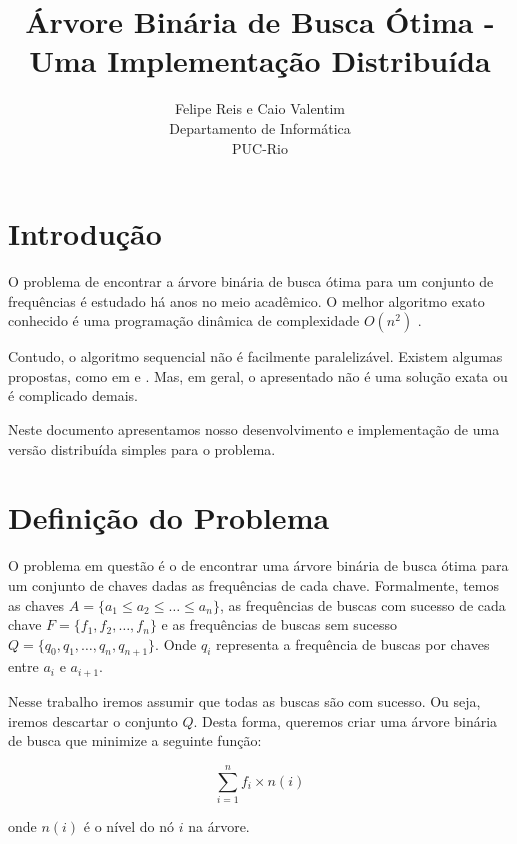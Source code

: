 \documentclass[12pt]{article}
\begin{document}
\nocite{*}

\title{Árvore Binária de Busca Ótima - Uma Implementação Distribuída}

\author{Felipe Reis e Caio Valentim\\ 
Departamento de Informática \\
PUC-Rio \\ 
}

\maketitle


\section{Introdução}
O problema de encontrar a árvore binária de busca ótima para um conjunto
de frequências é estudado há anos no meio acadêmico. O melhor algoritmo
exato conhecido é uma programação dinâmica de complexidade $O(n^2)$ \cite{knuth71}. 

Contudo, o algoritmo sequencial não é facilmente paralelizável. Existem
algumas propostas, como em \cite{karpinski94} e \cite{mitica}.
Mas, em geral, o apresentado não é uma solução exata ou é complicado demais.

Neste documento apresentamos nosso desenvolvimento e implementação 
de uma versão distribuída simples para o problema.


\section{Definição do Problema}

O problema em questão é o de encontrar uma árvore 
binária de busca ótima para um conjunto de chaves dadas as 
frequências de cada chave. Formalmente,
temos as chaves $A = \{a_1 \le a_2 \le \ldots \le a_n\}$,
as frequências de buscas com sucesso de cada chave $F = \{f_1, f_2, \ldots, f_n\}$ 
e as frequências de buscas sem sucesso $Q = \{q_0, q_1, \ldots, q_n, q_{n+1}\}$.
Onde $q_i$ representa a frequência de buscas por chaves entre $a_i$ e $a_{i+1}$.

Nesse trabalho iremos assumir que todas as buscas são com sucesso. Ou seja,
iremos descartar o conjunto $Q$. Desta forma, queremos criar uma árvore
binária de busca que minimize a seguinte função:

$$ \sum_{i=1}^n f_i \times n(i) $$

onde $n(i)$ é o nível do nó $i$ na árvore.
\end{document}
